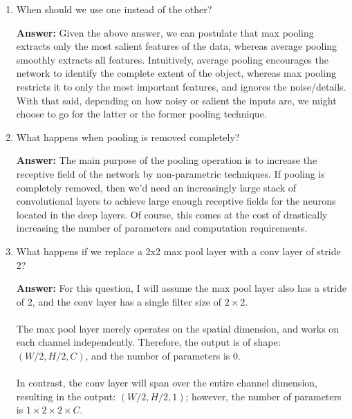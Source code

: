 \documentclass{article}
\newenvironment{QandA}{\begin{enumerate}[label=\arabic*.]}{\end{enumerate}}
\newenvironment{InnerQandA}{\begin{enumerate}[label=\roman*.]}{\end{enumerate}}
\newenvironment{answer}{\par\normalfont \textbf{Answer:}}{}
\begin{document}
\begin{QandA}
\begin{InnerQandA}
        \item When should we use one instead of the other?
        \begin{answer}
            Given the above answer, we can postulate that max pooling extracts only the most salient features of the data, whereas average pooling smoothly extracts all features. Intuitively, average pooling encourages the network to identify the complete extent of the object, whereas max pooling restricts it to only the most important features, and ignores the noise/details. With that said, depending on how noisy or salient the inputs are, we might choose to go for the latter or the former pooling technique.
        \end{answer}

        \item What happens when pooling is removed completely?
        \begin{answer}
            The main purpose of the pooling operation is to increase the receptive field of the network by non-parametric techniques. If pooling is completely removed, then we'd need an increasingly large stack of convolutional layers to achieve large enough receptive fields for the neurons located in the deep layers. Of course, this comes at the cost of drastically increasing the number of parameters and computation requirements.
        \end{answer}

        \item What happens if we replace a 2x2 max pool layer with a conv layer of stride 2?
        \begin{answer}
            For this question, I will assume the max pool layer also has a stride of 2, and the conv layer has a single filter size of $2 \times 2$. \\\\
            The max pool layer merely operates on the spatial dimension, and works on each channel independently. Therefore, the output is of shape: $(W/2, H/2, C)$, and the number of parameters is $0$. \\\\
            In contrast, the conv layer will span over the entire channel dimension, resulting in the output: $(W/2, H/2, 1)$; however, the number of parameters is $1 \times 2 \times 2 \times C$. 
        \end{answer}
    \end{InnerQandA}


\end{QandA}
\end{document}
